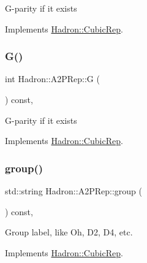 G-\/parity if it exists 

Implements \mbox{\hyperlink{structHadron_1_1CubicRep_a52104e43266d1614c00bbd1c3b395458}{Hadron\+::\+Cubic\+Rep}}.

\mbox{\label{structHadron_1_1A2PRep_a5011ad34ac95356b12a9da490244e399}} 
\subsubsection{\texorpdfstring{G()}{G()}\hspace{0.1cm}{\footnotesize\ttfamily [3/3]}}
{\footnotesize\ttfamily int Hadron\+::\+A2\+P\+Rep\+::G (\begin{DoxyParamCaption}{ }\end{DoxyParamCaption}) const\hspace{0.3cm}{\ttfamily [inline]}, {\ttfamily [virtual]}}

G-\/parity if it exists 

Implements \mbox{\hyperlink{structHadron_1_1CubicRep_a52104e43266d1614c00bbd1c3b395458}{Hadron\+::\+Cubic\+Rep}}.

\mbox{\label{structHadron_1_1A2PRep_accbc36395d6c73bf53f8914b3219f902}} 
\subsubsection{\texorpdfstring{group()}{group()}\hspace{0.1cm}{\footnotesize\ttfamily [1/3]}}
{\footnotesize\ttfamily std\+::string Hadron\+::\+A2\+P\+Rep\+::group (\begin{DoxyParamCaption}{ }\end{DoxyParamCaption}) const\hspace{0.3cm}{\ttfamily [inline]}, {\ttfamily [virtual]}}

Group label, like Oh, D2, D4, etc. 

Implements \mbox{\hyperlink{structHadron_1_1CubicRep_a0748f11ec87f387062c8e8981339a29c}{Hadron\+::\+Cubic\+Rep}}.

\mbox{\label{structHadron_1_1A2PRep_accbc36395d6c73bf53f8914b3219f902}} 
